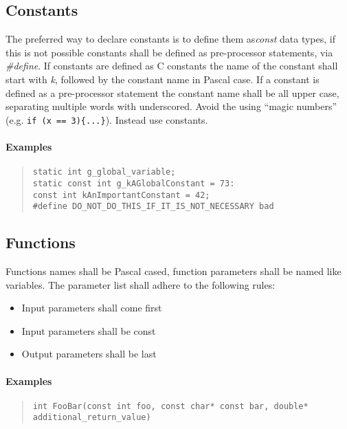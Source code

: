 \documentclass[final,a4paper,10pt, oneside]{article}
\begin{document}
\subsection{Constants}
The preferred way to declare constants is to define them as\emph{const} data types, if this is not possible constants shall be defined as pre-processor statements, via \emph{\#define}.
If constants are defined as C constants the name of the constant shall start with \emph{k}, followed by the constant name in Pascal case.
If a constant is defined as a pre-processor statement the constant name shall be all upper case, separating multiple words with underscored.
Avoid the using ``magic numbers'' (e.g. \verb|if (x == 3){...}|). Instead use constants.

\paragraph{Examples}
\begin{quote}
\begin{lstlisting}
static int g_global_variable;
static const int g_kAGlobalConstant = 73:
const int kAnImportantConstant = 42;
#define DO_NOT_DO_THIS_IF_IT_IS_NOT_NECESSARY bad
\end{lstlisting}
\end{quote}

\subsection{Functions}
Functions names shall be Pascal cased, function parameters shall be named like variables. The parameter list shall adhere to the following rules:
\begin{itemize}
    \item Input parameters shall come first
    \item Input parameters shall be const
    \item Output parameters shall be last
\end{itemize}

\paragraph{Examples}
\begin{quote}
\begin{lstlisting}
int FooBar(const int foo, const char* const bar, double* additional_return_value)
\end{lstlisting}
\end{quote}
\end{document}
